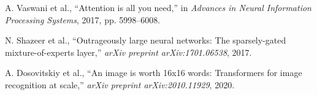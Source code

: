 \documentclass[10pt,journal,compsoc]{IEEEtran}
\begin{document}

\begin{thebibliography}{1}
A. Vaswani et al., ``Attention is all you need,'' in \textit{Advances in Neural Information Processing Systems}, 2017, pp. 5998--6008.

N. Shazeer et al., ``Outrageously large neural networks: The sparsely-gated mixture-of-experts layer,'' \textit{arXiv preprint arXiv:1701.06538}, 2017.

A. Dosovitskiy et al., ``An image is worth 16x16 words: Transformers for image recognition at scale,'' \textit{arXiv preprint arXiv:2010.11929}, 2020.
\end{thebibliography}
\end{document}
